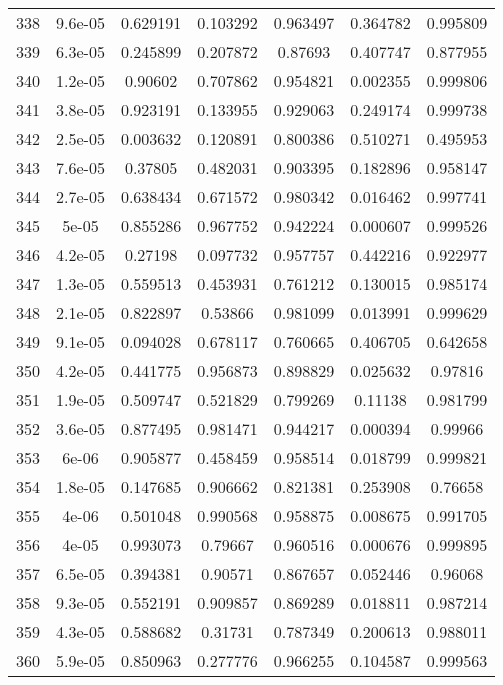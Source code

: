 \begin{table}
\begin{tabular}{c|c|c|c|c|c|c}
338 & 9.6e-05 & 0.629191 & 0.103292 & 0.963497 & 0.364782 & 0.995809\\
339 & 6.3e-05 & 0.245899 & 0.207872 & 0.87693 & 0.407747 & 0.877955\\
340 & 1.2e-05 & 0.90602 & 0.707862 & 0.954821 & 0.002355 & 0.999806\\
341 & 3.8e-05 & 0.923191 & 0.133955 & 0.929063 & 0.249174 & 0.999738\\
342 & 2.5e-05 & 0.003632 & 0.120891 & 0.800386 & 0.510271 & 0.495953\\
343 & 7.6e-05 & 0.37805 & 0.482031 & 0.903395 & 0.182896 & 0.958147\\
344 & 2.7e-05 & 0.638434 & 0.671572 & 0.980342 & 0.016462 & 0.997741\\
345 & 5e-05 & 0.855286 & 0.967752 & 0.942224 & 0.000607 & 0.999526\\
346 & 4.2e-05 & 0.27198 & 0.097732 & 0.957757 & 0.442216 & 0.922977\\
347 & 1.3e-05 & 0.559513 & 0.453931 & 0.761212 & 0.130015 & 0.985174\\
348 & 2.1e-05 & 0.822897 & 0.53866 & 0.981099 & 0.013991 & 0.999629\\
349 & 9.1e-05 & 0.094028 & 0.678117 & 0.760665 & 0.406705 & 0.642658\\
350 & 4.2e-05 & 0.441775 & 0.956873 & 0.898829 & 0.025632 & 0.97816\\
351 & 1.9e-05 & 0.509747 & 0.521829 & 0.799269 & 0.11138 & 0.981799\\
352 & 3.6e-05 & 0.877495 & 0.981471 & 0.944217 & 0.000394 & 0.99966\\
353 & 6e-06 & 0.905877 & 0.458459 & 0.958514 & 0.018799 & 0.999821\\
354 & 1.8e-05 & 0.147685 & 0.906662 & 0.821381 & 0.253908 & 0.76658\\
355 & 4e-06 & 0.501048 & 0.990568 & 0.958875 & 0.008675 & 0.991705\\
356 & 4e-05 & 0.993073 & 0.79667 & 0.960516 & 0.000676 & 0.999895\\
357 & 6.5e-05 & 0.394381 & 0.90571 & 0.867657 & 0.052446 & 0.96068\\
358 & 9.3e-05 & 0.552191 & 0.909857 & 0.869289 & 0.018811 & 0.987214\\
359 & 4.3e-05 & 0.588682 & 0.31731 & 0.787349 & 0.200613 & 0.988011\\
360 & 5.9e-05 & 0.850963 & 0.277776 & 0.966255 & 0.104587 & 0.999563\\
\end{tabular}
\end{table}
